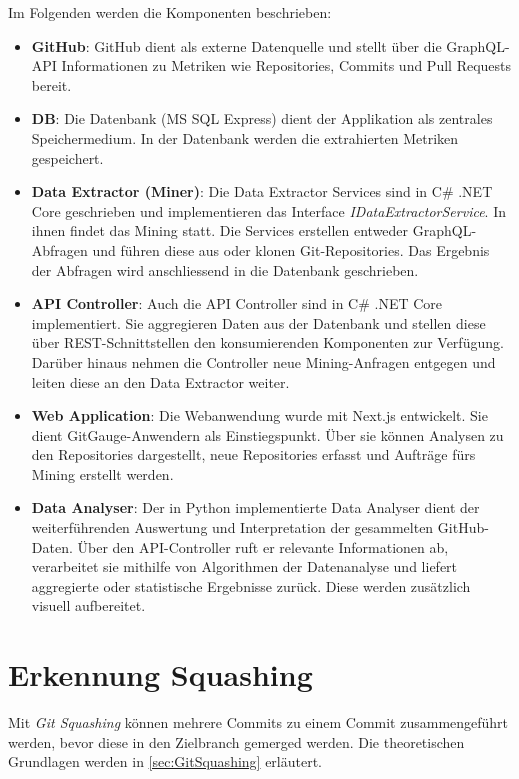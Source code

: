 Im Folgenden werden die Komponenten beschrieben:
\begin{itemize}
    \item \textbf{GitHub}: GitHub dient als externe Datenquelle und stellt über die GraphQL-API Informationen zu Metriken wie Repositories, Commits und Pull Requests bereit.
    \item \textbf{DB}: Die Datenbank (MS SQL Express) dient der Applikation als zentrales Speichermedium. In der Datenbank werden die extrahierten Metriken gespeichert. 
    \item \textbf{Data Extractor (Miner)}: Die Data Extractor Services sind in C\# .NET Core geschrieben und implementieren das Interface \textit{IDataExtractorService}. In ihnen findet das Mining statt. Die Services erstellen entweder GraphQL-Abfragen und führen diese aus oder klonen Git-Repositories. Das Ergebnis der Abfragen wird anschliessend in die Datenbank geschrieben. 
    \item \textbf{API Controller}: Auch die API Controller sind in C\# .NET Core implementiert. Sie aggregieren Daten aus der Datenbank und stellen diese über REST-Schnittstellen den konsumierenden Komponenten zur Verfügung. Darüber hinaus nehmen die Controller neue Mining-Anfragen entgegen und leiten diese an den Data Extractor weiter.
    \item \textbf{Web Application}: Die Webanwendung wurde mit Next.js entwickelt. Sie dient GitGauge-Anwendern als Einstiegspunkt. Über sie können Analysen zu den Repositories dargestellt, neue Repositories erfasst und Aufträge fürs Mining erstellt werden. 
    \item \textbf{Data Analyser}:  Der in Python implementierte Data Analyser dient der weiterführenden Auswertung und Interpretation der gesammelten GitHub-Daten. Über den API-Controller ruft er relevante Informationen ab, verarbeitet sie mithilfe von Algorithmen der Datenanalyse und liefert aggregierte oder statistische Ergebnisse zurück. Diese werden zusätzlich visuell aufbereitet.
\end{itemize}



\section{Erkennung Squashing}
Mit \textit{Git Squashing} können mehrere Commits zu einem Commit zusammengeführt werden, bevor diese in den Zielbranch gemerged werden. Die theoretischen Grundlagen werden in \autoref{sec:GitSquashing} erläutert. 

